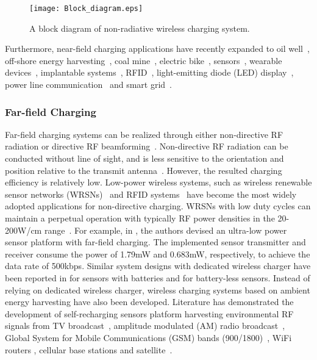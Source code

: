 \documentclass[twocolumn,10pt]{IEEEtran}
\begin{document}
\begin{figure*} 
\centering
\texttt{[image: Block\_diagram.eps]}
\caption{A block diagram of non-radiative wireless charging system.} \label{Block_diagram}
\end{figure*} 
 

Furthermore, near-field charging applications have recently expanded to oil well~\cite{X.2013Xin}, off-shore energy harvesting~\cite{Van2009Neste}, coal mine~\cite{Y.2011Zhou}, electric bike~\cite{F.2013Pellitteri}, sensors~\cite{K.2006Fotopoulou}, wearable devices~\cite{O.2013Jonah,N.2014Dobrostomat}, implantable systems~\cite{S.2013Ho,F.2009Zhang}, RFID~\cite{O.2014Mourad}, light-emitting diode (LED) display~\cite{I.2011Cho}, power line communication~\cite{S.2014Barmada} and smart grid~\cite{A.2014Kukde}.

\subsubsection{Far-field Charging}
 

Far-field charging systems can be realized through either non-directive RF radiation or directive RF beamforming~\cite{J.2013Visser}. 
Non-directive RF radiation can be conducted without line of sight, and is less sensitive to the orientation and position relative to the transmit antenna~\cite{E.2011Falkenstein}. However, the resulted charging efficiency is relatively low. 
Low-power wireless systems, such as wireless renewable sensor networks (WRSNs)~\cite{E.2011Falkenstein}  and RFID systems~\cite{A.2008Sample} have become the most widely adopted applications for non-directive charging. WRSNs with low duty cycles can maintain a perpetual operation with typically RF power densities in the 20-200W/cm range~\cite{Z.2013Popovic}. For example, in \cite{J.2012Hong}, the authors devised an ultra-low power sensor platform with far-field charging. The implemented sensor transmitter and receiver consume the power of 1.79mW and 0.683mW, respectively, to achieve the data rate of 500kbps. Similar system designs with dedicated wireless charger have been reported in \cite{D.2009Mascarenas,S.2014Percy,C.2014Cato} for sensors with batteries and \cite{N.Shinohara2014,L.2014Xia} for battery-less sensors. Instead of relying on dedicated wireless charger, wireless charging systems based on ambient energy harvesting have also been developed. Literature has demonstrated the development of self-recharging sensors platform harvesting environmental RF signals from TV broadcast~\cite{H.2010Nishimoto,P.2013Nintanavongsa,S.2014Kim,R.2013Vyas}, amplitude modulated (AM) radio broadcast~\cite{X2013Wang}, Global System for Mobile Communications (GSM) bands (900/1800)~\cite{B.2013Lim,M.2014Borges}, WiFi routers \cite{Abd2014Kadir,F.2014Alneyadi}, cellular base stations \cite{N.2013Parks} and satellite~\cite{2013A.Takacs,A.2013Takacs,A.Takacs2013}. 
\end{document}
